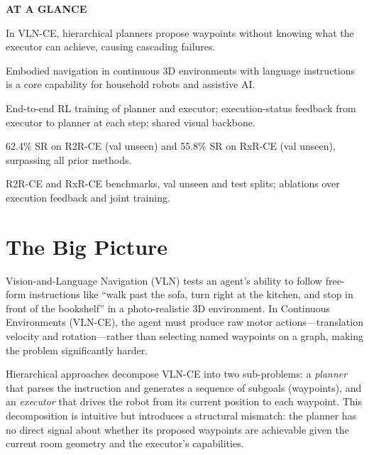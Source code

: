 \documentclass[10pt,twocolumn]{article}
\begin{document}
\begin{mdframed}[backgroundcolor=boxgray,linecolor=rulered,linewidth=1pt,
    innerleftmargin=6pt,innerrightmargin=6pt,
    innertopmargin=6pt,innerbottommargin=6pt]
\textbf{\small AT A GLANCE}\par\vspace{4pt}
\begin{description}[leftmargin=0pt,labelsep=4pt,itemsep=2pt,parsep=0pt,
    font=\small\bfseries]
  \item[Problem:] In VLN-CE, hierarchical planners propose waypoints
    without knowing what the executor can achieve, causing cascading
    failures.
  \item[Why it matters:] Embodied navigation in continuous 3D
    environments with language instructions is a core capability
    for household robots and assistive AI.
  \item[Method:] End-to-end RL training of planner and executor;
    execution-status feedback from executor to planner at each step;
    shared visual backbone.
  \item[Result:] 62.4\% SR on R2R-CE (val unseen) and 55.8\% SR on
    RxR-CE (val unseen), surpassing all prior methods.
  \item[Evidence:] R2R-CE and RxR-CE benchmarks, val unseen and
    test splits; ablations over execution feedback and joint training.
\end{description}
\end{mdframed}

\section{The Big Picture}

Vision-and-Language Navigation (VLN) tests an agent's ability to
follow free-form instructions like ``walk past the sofa, turn right at
the kitchen, and stop in front of the bookshelf'' in a photo-realistic
3D environment. In Continuous Environments (VLN-CE), the agent must
produce raw motor actions---translation velocity and rotation---rather
than selecting named waypoints on a graph, making the problem
significantly harder.

Hierarchical approaches decompose VLN-CE into two sub-problems:
a \emph{planner} that parses the instruction and generates a
sequence of subgoals (waypoints), and an \emph{executor} that
drives the robot from its current position to each waypoint.
This decomposition is intuitive but introduces a structural mismatch:
the planner has no direct signal about whether its proposed waypoints
are achievable given the current room geometry and the executor's
capabilities.
\end{document}

